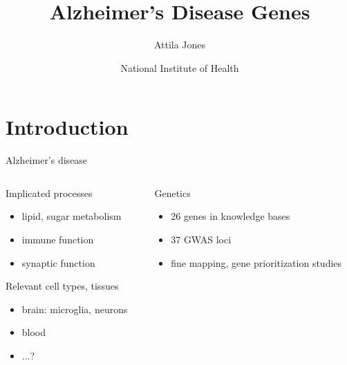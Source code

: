 \documentclass[aspectratio=169]{beamer}
\title{Alzheimer's Disease Genes}
\author{Attila Jones}
\date{National Institute of Health}
\begin{document}
\maketitle

\section{Introduction}

\begin{frame}{Alzheimer's disease}
\begin{columns}[t]
\begin{column}{0.5\textwidth}
Implicated processes
\begin{itemize}
\item lipid, sugar metabolism
\item immune function
\item synaptic function
\end{itemize}

Relevant cell types, tissues
\begin{itemize}
\item brain: microglia, neurons
\item blood
\item ...?
\end{itemize}
\end{column}

\begin{column}{0.5\textwidth}
Genetics
\begin{itemize}
\item 26 genes in knowledge bases
\item 37 GWAS loci
\item fine mapping, gene prioritization studies
\end{itemize}


\end{column}
\end{columns}
\end{frame}
\end{document}
